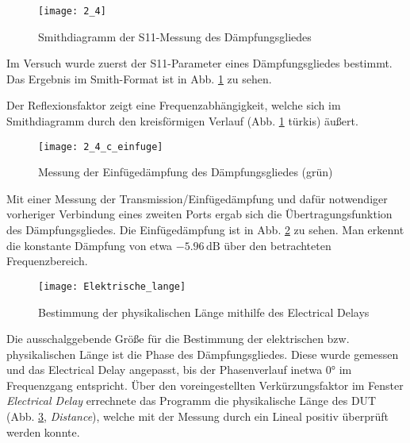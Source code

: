\begin{figure}[h]
  \texttt{[image: 2\_4]}
  \caption{Smithdiagramm der S11-Messung des Dämpfungsgliedes}
  \label{fig:2_4_smith}
\end{figure}

Im Versuch wurde zuerst der S11-Parameter eines Dämpfungsgliedes bestimmt. Das
Ergebnis im Smith-Format ist in Abb. \ref{fig:2_4_smith} zu sehen.

Der Reflexionsfaktor zeigt eine Frequenzabhängigkeit, welche sich im
Smithdiagramm durch den kreisförmigen Verlauf (Abb. \ref{fig:2_4_smith} türkis)
äußert.

\begin{figure}[h]
  \texttt{[image: 2\_4\_c\_einfuge]}
  \caption{Messung der Einfügedämpfung des Dämpfungsgliedes (grün)}
  \label{fig:2_4_einfuge}
\end{figure}

Mit einer Messung der Transmission/Einfügedämpfung und dafür notwendiger vorheriger Verbindung
eines zweiten Ports ergab sich die Übertragungsfunktion des Dämpfungsgliedes.
Die Einfügedämpfung ist in Abb. \ref{fig:2_4_einfuge} zu sehen. Man erkennt die konstante
Dämpfung von etwa $-5.96 \, \si{\deci\bel}$ über den betrachteten Frequenzbereich.

\begin{figure}[h]
  \texttt{[image: Elektrische\_lange]}
  \caption{Bestimmung der physikalischen Länge mithilfe des Electrical Delays}
  \label{fig:laenge1}
\end{figure}

Die ausschalggebende Größe für die Bestimmung der elektrischen bzw.
physikalischen Länge ist die Phase des Dämpfungsgliedes. Diese wurde gemessen
und das Electrical Delay angepasst, bis der Phasenverlauf inetwa $0
\si{\degree}$ im Frequenzgang entspricht. Über den voreingestellten
Verkürzungsfaktor im Fenster \emph{Electrical Delay} errechnete das Programm die
physikalische Länge des DUT (Abb. \ref{fig:laenge1}, \textit{Distance}), welche
mit der Messung durch ein Lineal positiv überprüft werden konnte.


